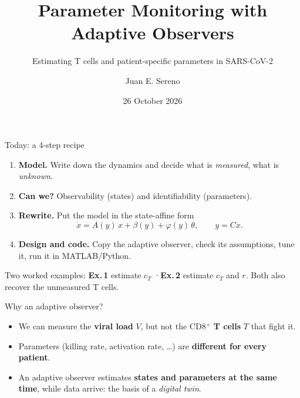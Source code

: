 \documentclass[aspectratio=169,11pt]{beamer}
\title{Parameter Monitoring with Adaptive Observers}
\subtitle{Estimating T cells and patient-specific parameters in SARS-CoV-2}
\author{Juan E. Sereno}
\institute{Postdoctoral Researcher, University of Dubrovnik\\ Mini-course \,·\, Semana IE--IC 2026}
\date{26 October 2026}
\newcommand{\mnote}[1]{{\small\color{muted}#1}}
\begin{document}
\maketitle

\begin{frame}{Today: a 4-step recipe}
\begin{enumerate}
  \setlength\itemsep{0.9em}
  \item \textbf{Model.} Write down the dynamics and decide what is \emph{measured}, what is \emph{unknown}.
  \item \textbf{Can we?} Observability (states) and identifiability (parameters).
  \item \textbf{Rewrite.} Put the model in the \alert{state-affine form}
        \[\dot x = A(y)\,x + \beta(y) + \varphi(y)\,\theta,\qquad y = Cx .\]
  \item \textbf{Design and code.} Copy the adaptive observer, check its assumptions, tune it, run it in MATLAB/Python.
\end{enumerate}
\vfill
\mnote{Two worked examples: \textbf{Ex.\,1} estimate $c_T$ \quad·\quad \textbf{Ex.\,2} estimate $c_T$ and $r$. \quad Both also recover the unmeasured T cells.}
\end{frame}

\begin{frame}{Why an adaptive observer?}
\centering
{}
\vspace{0.6cm}
\begin{itemize}
  \item We can measure the \textbf{viral load} $V$, but not the CD8$^+$ \textbf{T cells} $T$ that fight it.
  \item Parameters (killing rate, activation rate, \dots) are \textbf{different for every patient}.
  \item An adaptive observer estimates \textbf{states and parameters at the same time}, while data arrive: the basis of a \emph{digital twin}.
\end{itemize}
\end{frame}
\end{document}
